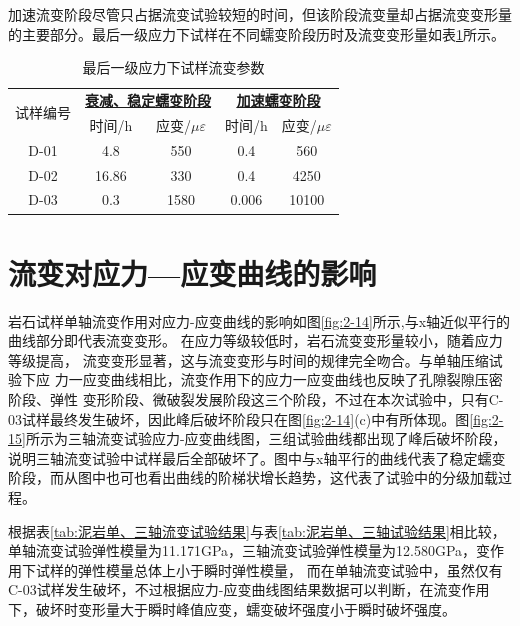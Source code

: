 加速流变阶段尽管只占据流变试验较短的时间，但该阶段流变量却占据流变变形量的主要部分。最后一级应力下试样在不同蠕变阶段历时及流变变形量如表\ref{tab:最后一级应力下试样流变参数}所示。
\begin{table}[H]
\centering
\begin{tabular}{ccccc}%
\toprule%
\multirow{2}{*}{试样编号}&\multicolumn{2}{c}{\textbf{\underline{衰减、稳定蠕变阶段}}}& \multicolumn{2}{c}{\textbf{\underline{加速蠕变阶段}}}  \\
&时间/h & 应变/$\mu\varepsilon$ & 时间/h & 应变/$\mu\varepsilon$ \\
\midrule%
D-01  &4.8&550& 0.4 & 560 \\%
\midrule%
D-02&16.86&330&0.4&4250 \\
\midrule
D-03&0.3&1580& 0.006&10100 \\
\bottomrule%
\end{tabular}
\caption{最后一级应力下试样流变参数}
\label{tab:最后一级应力下试样流变参数}
\end{table}



\section{流变对应力—应变曲线的影响}

岩石试样单轴流变作用对应力-应变曲线的影响如图\ref{fig:2-14}所示,与x轴近似平行的曲线部分即代表流变变形。
在应力等级较低时，岩石流变变形量较小，随着应力等级提高，
流变变形显著，这与流变变形与时间的规律完全吻合。与单轴压缩试验下应
力一应变曲线相比，流变作用下的应力一应变曲线也反映了孔隙裂隙压密阶段、弹性
变形阶段、微破裂发展阶段这三个阶段，不过在本次试验中，只有C-03试样最终发生破坏，因此峰后破坏阶段只在图\ref{fig:2-14}(c)中有所体现。图\ref{fig:2-15}所示为三轴流变试验应力-应变曲线图，三组试验曲线都出现了峰后破坏阶段，说明三轴流变试验中试样最后全部破坏了。图中与x轴平行的曲线代表了稳定蠕变阶段，而从图中也可也看出曲线的阶梯状增长趋势，这代表了试验中的分级加载过程。

根据表\ref{tab:泥岩单、三轴流变试验结果}与表\ref{tab:泥岩单、三轴试验结果}相比较，单轴流变试验弹性模量为11.171GPa，三轴流变试验弹性模量为12.580GPa，变作用下试样的弹性模量总体上小于瞬时弹性模量，
而在单轴流变试验中，虽然仅有C-03试样发生破坏，不过根据应力-应变曲线图结果数据可以判断，在流变作用下，破坏时变形量大于瞬时峰值应变，蠕变破坏强度小于瞬时破坏强度。

